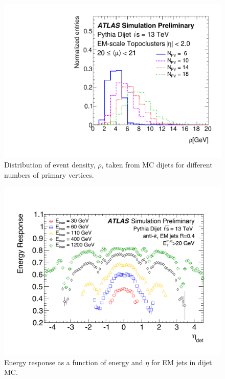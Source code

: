\begin{centering}
\begin{figure}[!hbt]
\myfloatalign
\includegraphics[width=.9\linewidth]{figures/reco/fig_02.pdf}
\caption{ Distribution of event \pt density, $\rho$, taken from \ac{MC} dijets for different numbers of primary vertices. \cite{ATL-PHYS-PUB-2015-015} }
\label{fig:reco_jet_nvtx}
\end{figure}
\end{centering}

\begin{centering}
\begin{figure}[!hbt]
\myfloatalign
\includegraphics[width=.9\linewidth]{figures/reco/fig_04a.pdf}
\caption{ Energy response as a function of energy and $\eta$ for \ac{EM} jets in dijet \ac{MC}. \cite{ATL-PHYS-PUB-2015-015} }
\label{fig:reco_JES}
\end{figure}
\end{centering}

